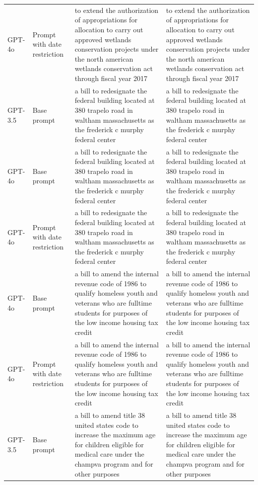 \begin{longtable}{>{\raggedright\arraybackslash}p{1.4cm}>{\raggedright\arraybackslash}p{1.4cm}>{\raggedright\arraybackslash}p{5.5cm}>{\raggedright\arraybackslash}p{5.5cm}}
GPT-4o & Prompt with date restriction & to extend the authorization of appropriations for allocation to carry out approved wetlands conservation projects under the north american wetlands conservation act through fiscal year 2017 & to extend the authorization of appropriations for allocation to carry out approved wetlands conservation projects under the north american wetlands conservation act through fiscal year 2017\\
GPT-3.5 & Base prompt & a bill to redesignate the federal building located at 380 trapelo road in waltham massachusetts as the frederick c murphy federal center & a bill to redesignate the federal building located at 380 trapelo road in waltham massachusetts as the frederick c murphy federal center\\
GPT-4o & Base prompt & a bill to redesignate the federal building located at 380 trapelo road in waltham massachusetts as the frederick c murphy federal center & a bill to redesignate the federal building located at 380 trapelo road in waltham massachusetts as the frederick c murphy federal center\\
GPT-4o & Prompt with date restriction & a bill to redesignate the federal building located at 380 trapelo road in waltham massachusetts as the frederick c murphy federal center & a bill to redesignate the federal building located at 380 trapelo road in waltham massachusetts as the frederick c murphy federal center\\
GPT-4o & Base prompt & a bill to amend the internal revenue code of 1986 to qualify homeless youth and veterans who are fulltime students for purposes of the low income housing tax credit & a bill to amend the internal revenue code of 1986 to qualify homeless youth and veterans who are fulltime students for purposes of the low income housing tax credit\\
GPT-4o & Prompt with date restriction & a bill to amend the internal revenue code of 1986 to qualify homeless youth and veterans who are fulltime students for purposes of the low income housing tax credit & a bill to amend the internal revenue code of 1986 to qualify homeless youth and veterans who are fulltime students for purposes of the low income housing tax credit\\
GPT-3.5 & Base prompt & a bill to amend title 38 united states code to increase the maximum age for children eligible for medical care under the champva program and for other purposes & a bill to amend title 38 united states code to increase the maximum age for children eligible for medical care under the champva program and for other purposes\\

\end{longtable}

